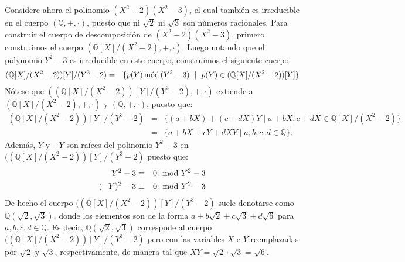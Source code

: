 \begin{example}
Considere ahora el polinomio $(X^2-2)(X^2-3)$, el cual también es
irreducible en el cuerpo $(\mathbb{Q},+,\cdot)$, puesto que ni
$\sqrt{2}$ ni $\sqrt{3}$ son números racionales. Para construir el
cuerpo de descomposición de $(X^2-2)(X^2-3)$, primero construimos el
cuerpo $(\mathbb{Q}[X]/(X^2-2), +, \cdot)$. Luego notando que el
polynomio $Y^2 - 3$ es irreducible en este cuerpo, construimos el
siguiente cuerpo:
\begin{eqnarray*}
  (\mathbb{Q}[X]/(X^2-2))[Y]/(Y^3-2) & = & \{p(Y) \mods (Y^2-3)  \ \mid \  p(Y)\in (\mathbb{Q}[X]/(X^2-2))[Y]\}
\end{eqnarray*}
Nótese que $((\mathbb{Q}[X]/(X^2-2))[Y]/(Y^3-2),+,\cdot)$ extiende a
$(\mathbb{Q}[X]/(X^2-2),+,\cdot)$ y  $(\mathbb{Q},+,\cdot)$, puesto
que:
\begin{eqnarray*}
  (\mathbb{Q}[X]/(X^2-2))[Y]/(Y^3-2) & = & \{(a+bX) + (c+dX)Y  \mid  a+bX, c+dX \in \mathbb{Q}[X]/(X^2-2)\}\\
  & = & \{ a+ bX + cY + dXY  \mid  a,b,c,d \in \mathbb{Q}\}.
\end{eqnarray*}
Además, $Y$ y $-Y$ son raíces del polinomio $Y^2-3$ en
$((\mathbb{Q}[X]/(X^2-2))[Y]/(Y^3-2)$ puesto que:
\begin{eqnarray*}
  Y^2 - 3 & \equiv & 0 \modl Y^2 - 3\\
  (-Y)^2 - 3 & \equiv & 0 \modl Y^2 - 3
\end{eqnarray*}
De hecho el cuerpo $((\mathbb{Q}[X]/(X^2-2))[Y]/(Y^3-2)$ suele
denotarse como $\mathbb{Q}(\sqrt{2},\sqrt{3})$, donde los
elementos son de la forma $a + b\sqrt{2} + c\sqrt{3} + d \sqrt{6}$
para $a,b,c,d \in \mathbb{Q}$. Es decir,
$\mathbb{Q}(\sqrt{2},\sqrt{3})$ correspode al cuerpo
$((\mathbb{Q}[X]/(X^2-2))[Y]/(Y^3-2)$ pero con las variables $X$ e $Y$
reemplazadas por $\sqrt{2}$ y $\sqrt{3}$, respectivamente, de manera
tal que $XY = \sqrt{2} \cdot \sqrt{3} = \sqrt{6}$.


\end{example}
